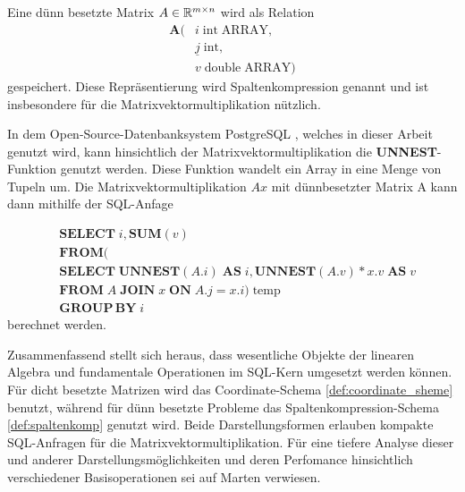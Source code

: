 \begin{defi}
    \label{def:spaltenkomp}
Eine dünn besetzte Matrix $A \in \mathbb{R}^{m \times n}$ wird als Relation
\begin{align*}
    \mathbf{A}(&i \; \mathrm{int} \; \mathrm{ARRAY}, \\
               &\underline{j} \; \mathrm{int}, \\
               &v \; \mathrm{double} \; \mathrm{ARRAY}
               )
\end{align*}
gespeichert. Diese Repräsentierung wird Spaltenkompression genannt und ist insbesondere für die Matrixvektormultiplikation nützlich.
\end{defi}
In dem Open-Source-Datenbanksystem PostgreSQL \cite{momjian2001postgresql}, welches in dieser Arbeit genutzt wird, kann hinsichtlich der Matrixvektormultiplikation die \textbf{UNNEST}-Funktion genutzt werden. Diese Funktion wandelt ein Array in eine Menge von Tupeln um. Die Matrixvektormultiplikation $Ax$ mit dünnbesetzter Matrix A kann dann mithilfe der SQL-Anfage

\begin{align*}
    &\mathbf{SELECT} \; i, \mathbf{SUM}(v)\\
    &\mathbf{FROM} (\\
    &\mathbf{SELECT} \; \mathbf{UNNEST}(A.i)\; \mathbf{AS} \; i, \mathbf{UNNEST}(A.v)*x.v \; \mathbf{AS} \; v \\
    &\mathbf{FROM} \; A \; \mathbf{JOIN} \; x \; \mathbf{ON} \; A.j=x.i ) \; \text{temp} \\
    &\mathbf{GROUP} \, \mathbf{BY} \; i
\end{align*}
berechnet werden.

Zusammenfassend stellt sich heraus, dass wesentliche Objekte der linearen Algebra und fundamentale Operationen im SQL-Kern umgesetzt werden können. Für dicht besetzte Matrizen wird das Coordinate-Schema \ref{def:coordinate_sheme} benutzt, während für dünn besetzte Probleme das Spaltenkompression-Schema \ref{def:spaltenkomp} genutzt wird. Beide Darstellungsformen erlauben kompakte SQL-Anfragen für die Matrixvektormultiplikation. Für eine tiefere Analyse dieser und anderer Darstellungsmöglichkeiten und deren Perfomance hinsichtlich verschiedener Basisoperationen sei auf Marten\cite{martendiss} verwiesen.





